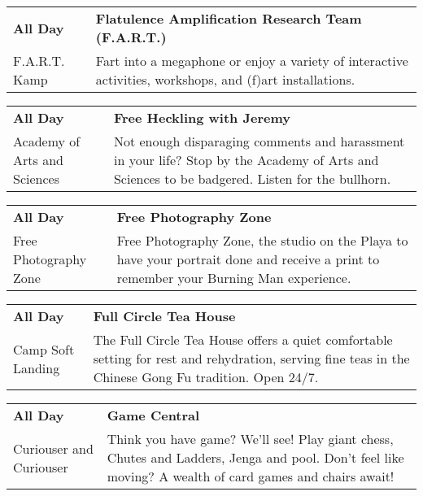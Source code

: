 \begin{tabular}{ p{1in} p{2.2in} }
    \textbf{All Day} & \textbf{Flatulence Amplification Research Team (F.A.R.T.) } \\
    F.A.R.T. Kamp \newline  & Fart into a megaphone or enjoy a variety of interactive activities, workshops, and (f)art installations. \\
    \hline 
\end{tabular}
    
\begin{tabular}{ p{1in} p{2.2in} }
    \textbf{All Day} & \textbf{Free Heckling with Jeremy} \\
    Academy of Arts and Sciences \newline  & Not enough disparaging comments and harassment in your life?  Stop by the Academy of Arts and Sciences to be badgered.  Listen for the bullhorn. \\
    \hline 
\end{tabular}
    
\begin{tabular}{ p{1in} p{2.2in} }
    \textbf{All Day} & \textbf{Free Photography Zone} \\
    Free Photography Zone \newline  & Free Photography Zone, the studio on the Playa to have your portrait done and receive a print to remember your Burning Man experience. \\
    \hline 
\end{tabular}
    
\begin{tabular}{ p{1in} p{2.2in} }
    \textbf{All Day} & \textbf{Full Circle Tea House} \\
    Camp Soft Landing \newline  & The Full Circle Tea House offers a quiet comfortable setting for rest and rehydration, serving fine teas in the Chinese Gong Fu tradition. Open 24/7. \\
    \hline 
\end{tabular}
    
\begin{tabular}{ p{1in} p{2.2in} }
    \textbf{All Day} & \textbf{Game Central} \\
    Curiouser and Curiouser \newline  & Think you have game? We'll see! Play giant chess, Chutes and Ladders, Jenga and pool. Don't feel like moving? A wealth of card games and chairs await! \\
    \hline 
\end{tabular}
    

